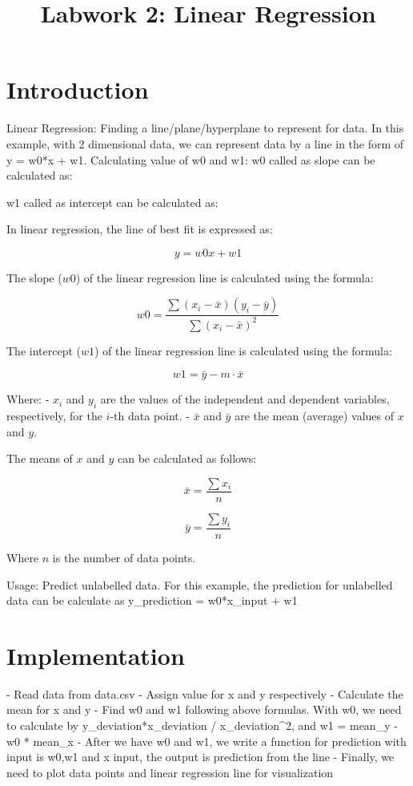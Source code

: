 \documentclass{article}
\title{Labwork 2: Linear Regression}
\begin{document}
\maketitle

\setlength\parindent{0pt}

\section{Introduction}

Linear Regression: Finding a line/plane/hyperplane to represent for data. In this example, with 2 dimensional data, we can represent data by  a line in the form of y = w0*x + w1. 
Calculating value of w0 and w1:
w0 called as slope can be calculated as:

w1 called as intercept can be calculated as:

\usepackage{amsmath} 

In linear regression, the line of best fit is expressed as:

\[ y = w0x + w1 \]

The slope (\( w0 \)) of the linear regression line is calculated using the formula:

\[ w0 = \frac{\sum (x_i - \bar{x}) (y_i - \bar{y})}{\sum (x_i - \bar{x})^2} \]

The intercept (\( w1 \)) of the linear regression line is calculated using the formula:

\[ w1 = \bar{y} - m \cdot \bar{x} \]

Where:
- \( x_i \) and \( y_i \) are the values of the independent and dependent variables, respectively, for the \( i \)-th data point.
- \( \bar{x} \) and \( \bar{y} \) are the mean (average) values of \( x \) and \( y \).

The means of \( x \) and \( y \) can be calculated as follows:

\[ \bar{x} = \frac{\sum x_i}{n} \]

\[ \bar{y} = \frac{\sum y_i}{n} \]

Where \( n \) is the number of data points.


Usage: Predict unlabelled data. For this example, the prediction for unlabelled data can be calculate as y_prediction = w0*x_input + w1
 

\section{Implementation}

- Read data from data.csv
- Assign value for x and y respectively
- Calculate the mean for x and y
- Find w0 and w1 following above formulas. With w0, we need to calculate by y_deviation*x_deviation / x_deviation^2, and w1 = mean_y - w0 * mean_x
- After we have w0 and w1, we write a function for prediction with input is w0,w1 and x input, the output is prediction from the line 
- Finally, we need to plot data points and linear regression line for visualization
\end{document}

